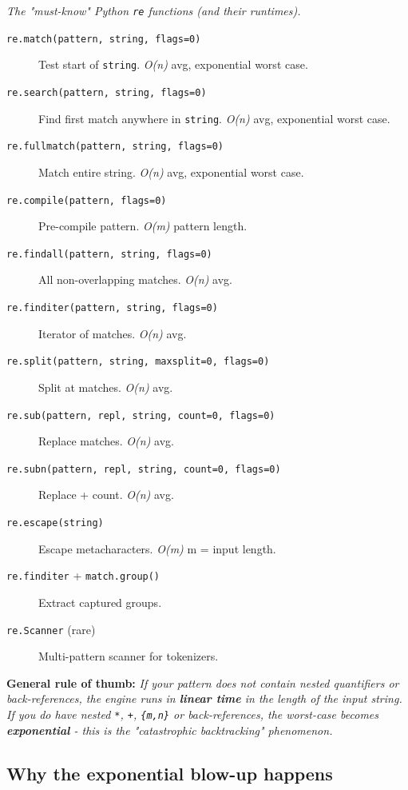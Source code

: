 \emph{The "must-know" Python \texttt{re} functions (and their runtimes).}

\begin{description}
    \item[\texttt{re.match(pattern, string, flags=0)}] Test start of \texttt{string}. \emph{O(n)} avg, exponential worst case.
    \item[\texttt{re.search(pattern, string, flags=0)}] Find first match anywhere in \texttt{string}. \emph{O(n)} avg, exponential worst case.
    \item[\texttt{re.fullmatch(pattern, string, flags=0)}] Match entire string. \emph{O(n)} avg, exponential worst case.
    \item[\texttt{re.compile(pattern, flags=0)}] Pre-compile pattern. \emph{O(m)} pattern length.
    \item[\texttt{re.findall(pattern, string, flags=0)}] All non-overlapping matches. \emph{O(n)} avg.
    \item[\texttt{re.finditer(pattern, string, flags=0)}] Iterator of matches. \emph{O(n)} avg.
    \item[\texttt{re.split(pattern, string, maxsplit=0, flags=0)}] Split at matches. \emph{O(n)} avg.
    \item[\texttt{re.sub(pattern, repl, string, count=0, flags=0)}] Replace matches. \emph{O(n)} avg.
    \item[\texttt{re.subn(pattern, repl, string, count=0, flags=0)}] Replace + count. \emph{O(n)} avg.
    \item[\texttt{re.escape(string)}] Escape metacharacters. \emph{O(m)} m = input length.
    \item[\texttt{re.finditer} + \texttt{match.group()}] Extract captured groups.
    \item[\texttt{re.Scanner} (rare)] Multi-pattern scanner for tokenizers.
\end{description}

\medskip

\textbf{General rule of thumb:} \emph{If your pattern does not contain nested quantifiers or back-references, the engine runs in \textbf{linear time} in the length of the input string.}
\textit{If you do have nested \texttt{*}, \texttt{+}, \texttt{\{m,n\}} or back-references, the worst-case becomes \textbf{exponential} - this is the "catastrophic backtracking" phenomenon.}

\subsection*{Why the exponential blow-up happens}

